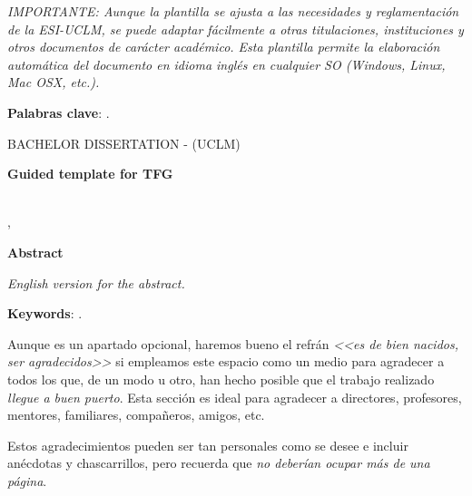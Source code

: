 \noindent\emph{IMPORTANTE: Aunque la plantilla se ajusta a las necesidades y reglamentación de la ESI-UCLM, se puede adaptar fácilmente a otras titulaciones, instituciones y otros documentos de carácter académico. Esta plantilla permite la elaboración automática del documento en idioma inglés en cualquier SO (Windows, Linux, Mac OSX, etc.).}

\bigskip
\noindent\textbf{Palabras clave}: \keywordslist.

\cleardoublepage %

\makeatletter
\begin{center} %
   {\textsc{BACHELOR DISSERTATION - \@centroEdu{}
   (UCLM)}\par}
   \vspace{1cm} %
   {\textbf{\Large Guided template for TFG}\par}
   \vspace{0.4cm} %
   {\@autor \\ \@cityTF,{} \@monthTF{} \@yearTF\par} 
   \vspace{0.9cm} %
   {\textbf{\large\textsf{Abstract}}\par} 
\end{center}   
\makeatother %
\emph{English version for the abstract.}

\bigskip 
\noindent\textbf{Keywords}: \keywordslist.

Aunque es un apartado opcional, haremos bueno el refrán \emph{<<es de bien nacidos, ser agradecidos>>} si empleamos este espacio como un medio para agradecer a todos los que, de un modo u otro, han hecho posible que el trabajo realizado \emph{llegue a buen puerto}. Esta sección es ideal para agradecer a directores, profesores, mentores, familiares, compañeros, amigos, etc. 
 
Estos agradecimientos pueden ser tan personales como se desee e incluir anécdotas y chascarrillos, pero recuerda que \emph{no deberían ocupar más de una página}.

\firma %

